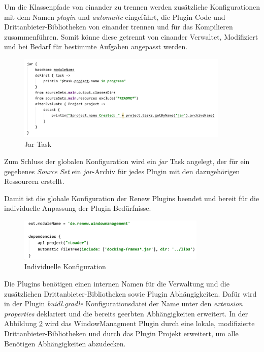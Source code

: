 	Um die Klassenpfade von einander zu trennen werden zusätzliche Konfigurationen mit dem Namen \textit{plugin} und \textit{automaitc} eingeführt, die Plugin Code und Drittanbieter-Bibliotheken von einander trennen und für das Kompilieren zusammenführen. Somit könne diese getrennt von einander Verwaltet, Modifiziert und bei Bedarf für bestimmte Aufgaben angepasst werden. 
	\bigbreak

	\begin{figure}[h!]
	  \centering
	  \includegraphics[width=0.9\textwidth]{material/images/jar.png}
	  \caption{Jar Task}
	  \label{fig:jar}
	\end{figure}

	Zum Schluss der globalen Konfiguration wird ein \textit{jar} Task angelegt, der für ein gegebenes \textit{Source Set} ein \textit{jar}-Archiv für jedes Plugin mit den dazugehörigen Ressourcen erstellt. 


	Damit ist die globale Konfiguration der Renew Plugins beendet und bereit für die individuelle Anpassung der Plugin Bedürfnisse.
	\bigbreak

	\begin{figure}[h!]
	  \centering
	  \includegraphics[width=0.8\textwidth]{material/images/windmang.png}
	  \caption{Individuelle Konfiguration}
	  \label{fig:windmang}
	\end{figure}

	Die Plugins benötigen einen internen Namen für die Verwaltung und die zusätzlichen Drittanbieter-Bibliotheken sowie Plugin Abhängigkeiten. Dafür wird in der Plugin \textit{buidl.gradle} Konfigurationsdatei der Name unter den \textit{extension properties} deklariert und die bereits geerbten Abhängigkeiten erweitert. In der Abbildung \ref{fig:windmang} wird das WindowManagment Plugin durch eine lokale, modifizierte Drittanbieter-Bibliotheken  und durch das Plugin Projekt erweitert, um alle Benötigen Abhängigkeiten abzudecken. 
	\bigbreak


